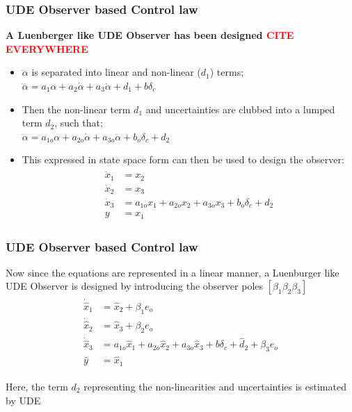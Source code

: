 \documentclass[table,10pt,red]{beamer}	%
\begin{document}
\begin{frame}
\frametitle{UDE Observer based Control law}
	\textbf{A Luenberger like UDE Observer has been designed \textcolor{red}{CITE EVERYWHERE}}


\begin{itemize}  %
	\item $\dddot{\alpha}$ is separated into linear and non-linear ($d_1$) terms; $\dddot{\alpha} = a_1 \alpha + a_2 \dot{\alpha} + a_3 \ddot{\alpha} + d_1 + b\delta_c$
	
	\item Then the non-linear term $d_1$ and uncertainties are clubbed into a lumped term $d_2$, such that; \\
	$\dddot{\alpha} = a_{1o} \alpha + a_{2o} \dot{\alpha} + a_{3o} \ddot{\alpha} + b_o\delta_c + d_2$\\
	
	\item This expressed in state space form can then be used to design the observer:
	\begin{eqnarray*}
		\begin{aligned}
			\dot{x}_1 &= x_2 \\
			\dot{x}_2 &= x_3 \\
			\dot{x}_3 &= a_{1o}x_1 + a_{2o}x_2 + a_{3o}x_3 + b_o \delta_c + d_2 \\
			y &= x_1 \label{rx1}
		\end{aligned}
		\label{eq5}
	\end{eqnarray*}
	
\end{itemize}

\end{frame}

\begin{frame}
\frametitle{UDE Observer based Control law}

Now since the equations are represented in a linear manner, a Luenburger like UDE Observer is designed by introducing the observer poles $[\beta_1 \beta_2 \beta_3]$
\begin{eqnarray*}
	\begin{aligned}
		\dot{\hat{x}}_1 &= \hat{x}_2 + \beta_1 e_o\\
		\dot{\hat{x}}_2 &= \hat{x}_3 + \beta_2 e_o\\
		\dot{\hat{x}}_3 &= a_{1o}\hat{x}_1 + a_{2o}\hat{x}_2 + a_{3o}\hat{x}_3 + b \delta_c + \hat{d}_2 + \beta_3 e_o\\		
		\hat{y} &= \hat{x}_1 \label{ss1}
	\end{aligned}
	\label{eq5}
\end{eqnarray*}

Here, the term $d_2$ representing the non-linearities and uncertainties is estimated by UDE

\end{frame}
\end{document}
